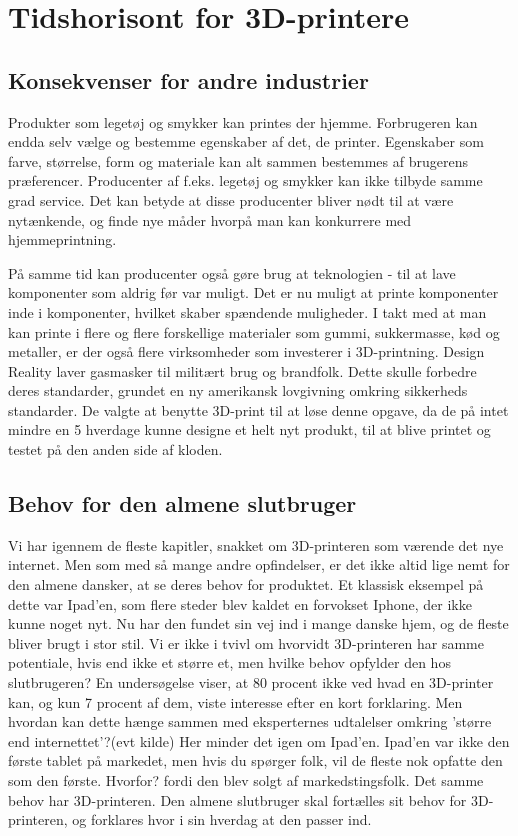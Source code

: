
\chapter{Tidshorisont for 3D-printere}
\section{Konsekvenser for andre industrier}


Produkter som legetøj og smykker kan printes der hjemme. Forbrugeren kan endda selv vælge og bestemme egenskaber af det, de printer. Egenskaber som farve, størrelse, form og materiale kan alt sammen bestemmes af brugerens præferencer. Producenter af f.eks. legetøj og smykker kan ikke tilbyde samme grad service. Det kan betyde at disse producenter bliver nødt til at være nytænkende, og finde nye måder hvorpå man kan konkurrere med hjemmeprintning.

På samme tid kan producenter også gøre brug at teknologien -{} til at lave komponenter som aldrig før var muligt. Det er nu muligt at printe komponenter inde i komponenter, hvilket skaber spændende muligheder.
I takt med at man kan printe i flere og flere forskellige materialer som gummi, sukkermasse, kød og metaller, er der også flere virksomheder som investerer i 3D-printning.
Design Reality laver gasmasker til militært brug og brandfolk. Dette skulle forbedre deres standarder, grundet en ny amerikansk lovgivning omkring sikkerheds standarder. De valgte at benytte 3D-print til at løse denne opgave, da de på intet mindre en 5 hverdage kunne designe et helt nyt produkt, til at blive printet og testet på den anden side af kloden. \autocite{3ders.org_design_2013}





\section{Behov for den almene slutbruger}

Vi har igennem de fleste kapitler, snakket om 3D-printeren som værende det nye internet. Men som med så mange andre opfindelser, er det ikke altid lige nemt for den almene dansker, at se deres behov for produktet. Et klassisk eksempel på dette var Ipad'en, som flere steder blev kaldet en forvokset Iphone, der ikke kunne noget nyt. Nu har den fundet sin vej ind i mange danske hjem, og de fleste bliver brugt i stor stil. 
Vi er ikke i tvivl om hvorvidt 3D-printeren har samme potentiale, hvis end ikke et større et, men hvilke behov opfylder den hos slutbrugeren? En undersøgelse viser, at 80 procent ikke ved hvad en 3D-printer kan, og kun 7 procent af dem, viste interesse efter en kort forklaring.
Men hvordan kan dette hænge sammen med eksperternes udtalelser omkring 'større end internettet'?(evt kilde) Her minder det igen om Ipad'en. Ipad'en var ikke den første tablet på markedet, men hvis du spørger folk, vil de fleste nok opfatte den som den første. Hvorfor? fordi den blev solgt af markedstingsfolk. Det samme behov har 3D-printeren. Den almene slutbruger skal fortælles sit behov for 3D-printeren, og forklares hvor i sin hverdag at den passer ind.


